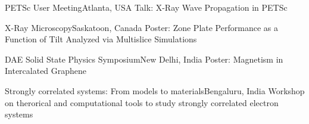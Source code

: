 {PETSc User Meeting}{Atlanta, USA}
{\newline Talk: X-Ray Wave Propagation in PETSc} 
{}
{}


{X-Ray Microscopy}{Saskatoon, Canada}
{\newline Poster: Zone Plate Performance as a Function of Tilt Analyzed via Multislice Simulations} 
{}
{}

{DAE Solid State Physics Symposium}{New Delhi, India}
{\newline Poster: Magnetism in Intercalated Graphene} 
{}
{}

{Strongly correlated systems: From models to materials}{Bengaluru, India}
{\newline Workshop on therorical and computational tools to study strongly correlated electron systems} 
{}
{}

